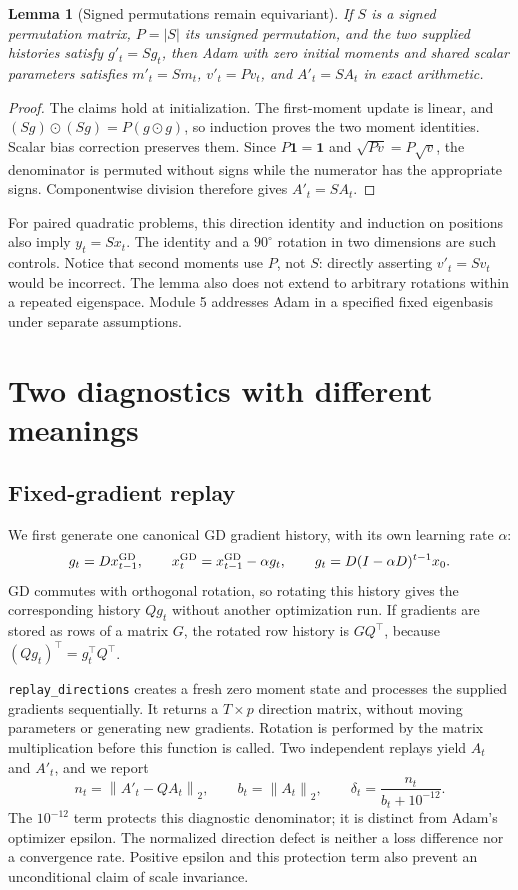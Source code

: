 \documentclass[11pt,a4paper]{article}
\newtheorem{lemma}{Lemma}
\newcommand{\norm}[1]{\left\lVert#1\right\rVert}
\begin{document}
\begin{lemma}[Signed permutations remain equivariant]
If $S$ is a signed permutation matrix, $P=|S|$ its unsigned permutation,
and the two supplied histories satisfy $g'_t=Sg_t$, then Adam with zero
initial moments and shared scalar parameters satisfies
$m'_t=Sm_t$, $v'_t=Pv_t$, and $A'_t=SA_t$ in exact arithmetic.
\end{lemma}
\begin{proof}
The claims hold at initialization. The first-moment update is linear, and
$(Sg)\odot(Sg)=P(g\odot g)$, so induction proves the two moment identities.
Scalar bias correction preserves them. Since $P\mathbf1=\mathbf1$ and
$\sqrt{Pv}=P\sqrt v$, the denominator is permuted without signs while the
numerator has the appropriate signs. Componentwise division therefore gives
$A'_t=SA_t$.
\end{proof}
For paired quadratic problems, this direction identity and induction on
positions also imply $y_t=Sx_t$. The identity and a $90^\circ$ rotation in
two dimensions are such controls. Notice that second moments use $P$, not
$S$: directly asserting $v'_t=Sv_t$ would be incorrect. The lemma also does
not extend to arbitrary rotations within a repeated eigenspace. Module 5
addresses Adam in a specified fixed eigenbasis under separate assumptions.

\section{Two diagnostics with different meanings}
\subsection{Fixed-gradient replay}
We first generate one canonical GD gradient history, with its own learning
rate $\alpha$:
\[
 g_t=Dx_{t-1}^{\rm GD},\qquad
 x_t^{\rm GD}=x_{t-1}^{\rm GD}-\alpha g_t,
 \qquad
 g_t=D(I-\alpha D)^{t-1}x_0.
\]
GD commutes with orthogonal rotation, so rotating this history gives the
corresponding history $Qg_t$ without another optimization run. If gradients
are stored as rows of a matrix $G$, the rotated row history is $GQ^\top$,
because $(Qg_t)^\top=g_t^\top Q^\top$.

\texttt{replay\_directions} creates a fresh zero moment state and processes
the supplied gradients sequentially. It returns a $T\times p$ direction
matrix, without moving parameters or generating new gradients. Rotation is
performed by the matrix multiplication before this function is called.
Two independent replays yield $A_t$ and $A'_t$, and we report
\begin{equation}
 n_t=\norm{A'_t-QA_t}_2,\qquad
 b_t=\norm{A_t}_2,\qquad
 \delta_t=\frac{n_t}{b_t+10^{-12}}.
 \label{eq:defect}
\end{equation}
The $10^{-12}$ term protects this diagnostic denominator; it is distinct
from Adam's optimizer epsilon. The normalized direction defect is neither
a loss difference nor a convergence rate. Positive epsilon and this
protection term also prevent an unconditional claim of scale invariance.
\end{document}
